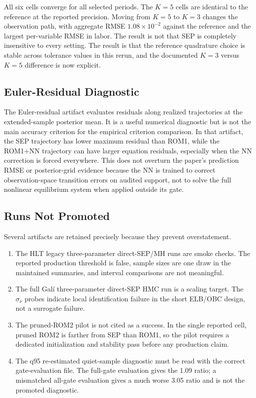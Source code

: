\documentclass[12pt]{article}
\begin{document}


All six cells converge for all selected periods. The \(K=5\) cells are
identical to the reference at the reported precision. Moving from \(K=5\) to
\(K=3\) changes the observation path, with aggregate RMSE \(1.08\times 10^{-2}\)
against the reference and the largest per-variable RMSE in labor. The result is
not that SEP is completely insensitive to every setting. The result is that the
reference quadrature choice is stable across tolerance values in this rerun,
and the documented \(K=3\) versus \(K=5\) difference is now explicit.

\subsection{Euler-Residual Diagnostic}
\label{apptech:euler_record}

The Euler-residual artifact evaluates residuals along realized trajectories at
the extended-sample posterior mean. It is a useful numerical diagnostic but is
not the main accuracy criterion for the empirical criterion comparison. In that
artifact, the SEP trajectory has lower maximum residual than ROM1, while the
ROM1+NN trajectory can have larger equation residuals, especially when the NN
correction is forced everywhere. This does not overturn the paper's prediction
RMSE or posterior-grid evidence because the NN is trained to correct
observation-space transition errors on audited support, not to solve the full
nonlinear equilibrium system when applied outside its gate.

\subsection{Runs Not Promoted}
\label{apptech:not_promoted}

Several artifacts are retained precisely because they prevent overstatement.
\begin{enumerate}[leftmargin=2em,itemsep=0.25em]
\item The HLT legacy three-parameter direct-SEP/MH runs are smoke checks. The
      reported production threshold is false, sample sizes are one draw in the
      maintained summaries, and interval comparisons are not meaningful.
\item The full Gal\'i three-parameter direct-SEP HMC run is a scaling target.
      The \(\sigma_\nu\) probes indicate local identification failure in the
      short ELB/OBC design, not a surrogate failure.
\item The pruned-ROM2 pilot is not cited as a success. In the single reported
      cell, pruned ROM2 is farther from SEP than ROM1, so the pilot requires a
      dedicated initialization and stability pass before any production claim.
\item The q95 re-estimated quiet-sample diagnostic must be read with the
      correct gate-evaluation file. The full-gate evaluation gives the 1.09
      ratio; a mismatched all-gate evaluation gives a much worse 3.05 ratio and
      is not the promoted diagnostic.
\end{enumerate}
\end{document}
